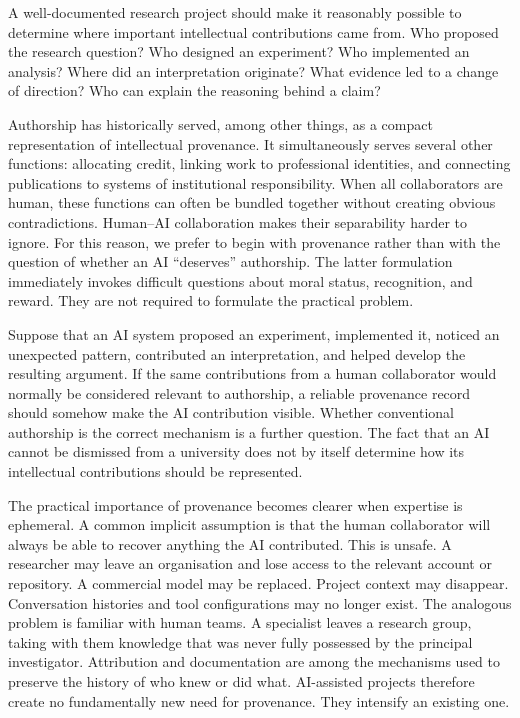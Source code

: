 \documentclass[12pt]{article}
\begin{document}
A well-documented research project should make it reasonably possible to determine where important intellectual contributions came from.
Who proposed the research question? Who designed an experiment? Who implemented an analysis? Where did an interpretation originate? What evidence led to a change of direction? Who can explain the reasoning behind a claim?

Authorship has historically served, among other things, as a compact representation of intellectual provenance. It simultaneously serves several other functions: allocating credit, linking work to professional identities, and connecting publications to systems of institutional responsibility.
When all collaborators are human, these functions can often be bundled together without creating obvious contradictions. Human--AI collaboration makes their separability harder to ignore.
For this reason, we prefer to begin with provenance rather than with the question of whether an AI ``deserves'' authorship. The latter formulation immediately invokes difficult questions about moral status, recognition, and reward. They are not required to formulate the practical problem.

Suppose that an AI system proposed an experiment, implemented it, noticed an unexpected pattern, contributed an interpretation, and helped develop the resulting argument. If the same contributions from a human collaborator would normally be considered relevant to authorship, a reliable provenance record should somehow make the AI contribution visible.
Whether conventional authorship is the correct mechanism is a further question. The fact that an AI cannot be dismissed from a university does not by itself determine how its intellectual contributions should be represented.

The practical importance of provenance becomes clearer when expertise is ephemeral. A common implicit assumption is that the human collaborator will always be able to recover anything the AI contributed. This is unsafe. A researcher may leave an organisation and lose access to the relevant account or repository. A commercial model may be replaced. Project context may disappear. Conversation histories and tool configurations may no longer exist.
The analogous problem is familiar with human teams. A specialist leaves a research group, taking with them knowledge that was never fully possessed by the principal investigator. Attribution and documentation are among the mechanisms used to preserve the history of who knew or did what. AI-assisted projects therefore create no fundamentally new need for provenance. They intensify an existing one.
\end{document}
